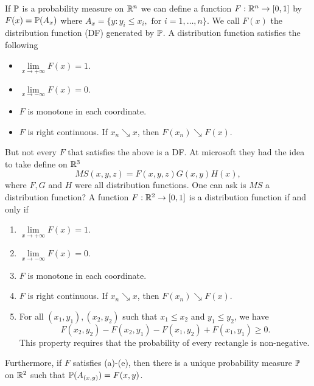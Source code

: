 If ${\mathbb{P}}$ is a probability measure on ${\mathbb R}^n$ we can define a function $F : {\mathbb R}^n \to [0,1]$ by $F(x) = {\mathbb{P}}(A_x)$ where $A_x=\{y : y_i \le x_i, \text{ for } i =1,\ldots, n\}$. We call $F(x)$ the distribution function (DF) generated by ${\mathbb{P}}$. A distribution function satisfies the following
\begin{itemize}
    \item $\lim\limits_{x \to +\infty} F(x)=1$.
    \item $\lim\limits_{x \to -\infty} F(x)=0$.
    \item $F$ is monotone in each coordinate.
    \item $F$ is right continuous. If $x_n \searrow x$, then $F(x_n) \searrow F(x)$.
\end{itemize}
But not every $F$ that satisfies the above is a DF. At microsoft they had the idea to take define on ${\mathbb R}^3$
\[MS(x,y,z) = F(x,y,z)G(x,y)H(x), \]
where $F,G$ and $H$ were all distribution functions. One can ask is $MS$ a distribution function? A function $F: {\mathbb R}^2 \to [0,1]$ is a distribution function if and only if
\begin{enumerate}
    \item $\lim\limits_{x \to +\infty} F(x)=1$.
    \item $\lim\limits_{x \to -\infty} F(x)=0$.
    \item $F$ is monotone in each coordinate.
    \item $F$ is right continuous. If $x_n \searrow x$, then $F(x_n) \searrow F(x)$. 
    \item For all $(x_1,y_1),(x_2,y_2)$ such that $x_1 \le x_2$ and $y_1 \le y_2$, we have
    \[F(x_2,y_2)-F(x_2,y_1)-F(x_1,y_2)+F(x_1,y_1)\ge0. \]
    This property requires that the probability of every rectangle is non-negative.
\end{enumerate}
Furthermore, if $F$ satisfies (a)-(e), then there is a unique probability measure ${\mathbb{P}}$ on ${\mathbb R}^2$ such that ${\mathbb{P}}(A_{(x,y)}) =F(x,y)$.

